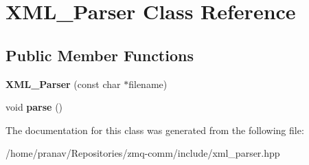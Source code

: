 \hypertarget{classXML__Parser}{}\section{X\+M\+L\+\_\+\+Parser Class Reference}
\label{classXML__Parser}
\subsection*{Public Member Functions}
\begin{DoxyCompactItemize}
\item 
{\bfseries X\+M\+L\+\_\+\+Parser} (const char $\ast$filename)\hypertarget{classXML__Parser_aa0a4bad8139300742b2458f81f171d7f}{}\label{classXML__Parser_aa0a4bad8139300742b2458f81f171d7f}

\item 
void {\bfseries parse} ()\hypertarget{classXML__Parser_ae8f40d4faba09275a2d2e97c8966c379}{}\label{classXML__Parser_ae8f40d4faba09275a2d2e97c8966c379}

\end{DoxyCompactItemize}


The documentation for this class was generated from the following file\+:\begin{DoxyCompactItemize}
\item 
/home/pranav/\+Repositories/zmq-\/comm/include/xml\+\_\+parser.\+hpp\end{DoxyCompactItemize}
